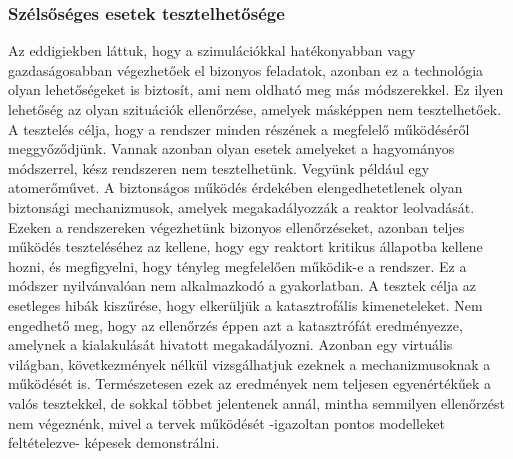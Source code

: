         \subsubsection{Szélsőséges esetek tesztelhetősége}
        Az eddigiekben láttuk, hogy a szimulációkkal hatékonyabban vagy gazdaságosabban végezhetőek el bizonyos feladatok, azonban ez a technológia olyan lehetőségeket is biztosít, ami nem oldható meg más módszerekkel.
        Ez ilyen lehetőség az olyan szituációk ellenőrzése, amelyek másképpen nem tesztelhetőek. A tesztelés célja, hogy a rendszer minden részének a megfelelő működéséről meggyőződjünk.
        Vannak azonban olyan esetek amelyeket a hagyományos módszerrel, kész rendszeren nem tesztelhetünk.
        Vegyünk például egy atomerőművet. A biztonságos működés érdekében elengedhetetlenek olyan biztonsági mechanizmusok, amelyek megakadályozzák a reaktor leolvadását.
        Ezeken a rendszereken végezhetünk bizonyos ellenőrzéseket, azonban teljes működés teszteléséhez az kellene, hogy egy reaktort kritikus állapotba kellene hozni, és megfigyelni, hogy tényleg megfelelően működik-e a rendszer.
        Ez a módszer nyilvánvalóan nem alkalmazkodó a gyakorlatban. A tesztek célja az esetleges hibák kiszűrése, hogy elkerüljük a katasztrofális kimeneteleket. Nem engedhető meg, hogy az ellenőrzés éppen azt a katasztrófát eredményezze, amelynek a kialakulását hivatott megakadályozni.
        Azonban egy virtuális világban, következmények nélkül vizsgálhatjuk ezeknek a mechanizmusoknak a működését is. Természetesen ezek az eredmények nem teljesen egyenértékűek a valós tesztekkel, de sokkal többet jelentenek annál, mintha semmilyen ellenőrzést nem végeznénk, mivel a tervek működését -igazoltan pontos modelleket feltételezve- képesek demonstrálni.

